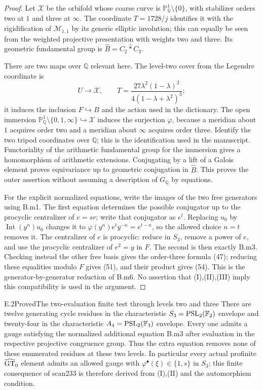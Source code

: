 \begin{proof}
Let $\mathcal X$ be the orbifold whose coarse curve is
$\mathbb P^1_\mathbb Q\setminus\{0\}$, with stabilizer orders two at
$1$ and three at $\infty$. The coordinate $T=1728/j$ identifies it with
the rigidification of $\mathcal M_{1,1}$ by its generic elliptic
involution; this can equally be seen from the weighted projective
presentation with weights two and three. Its geometric fundamental
group is $\widehat B=C_2\widehat * C_3$.

There are two maps over $\mathbb Q$ relevant here. The level-two cover
from the Legendre coordinate is
\[
 U\longrightarrow\mathcal X,\qquad
 T=\frac{27\lambda^2(1-\lambda)^2}
          {4(1-\lambda+\lambda^2)^3};
\]
it induces the inclusion $F\hookrightarrow B$ and the action used in
the dictionary. The open immersion
$\mathbb P^1_\mathbb Q\setminus\{0,1,\infty\}\hookrightarrow\mathcal X$
induces the surjection $\varphi$, because a meridian about $1$ acquires
order two and a meridian about $\infty$ acquires order three. Identify
the two tripod coordinates over $\mathbb Q$; this is the identification
used in the manuscript. Functoriality of the arithmetic fundamental
group for the immersion gives a homomorphism of arithmetic extensions.
Conjugating by a lift of a Galois element proves equivariance up to
geometric conjugation in $\widehat B$. This proves the outer assertion
without assuming a description of $G_\mathbb Q$ by equations.

For the explicit normalized equations, write the images of the two
free generators using B.m1. The first equation determines the possible
conjugator up to the procyclic centralizer of $e=sr$; write that conjugator as $e^t$. Replacing $u_0$ by
$\operatorname{Int}(y^n)u_0$ changes it to
$\varphi(y^n)e^t y^{-n}=e^{t-n}$, so the allowed choice $n=t$
removes it. The centralizer of $e$ is procyclic: reduce in $S_3$,
remove a power of $e$, and use the procyclic centralizer of
$e^2=y$ in $\widehat F$. The second is then exactly
B.m3. Checking instead the other free basis gives the order-three
formula (47); reducing these equalities modulo $F$ gives (51), and
their product gives (54). This is the generator-by-generator reduction
of B.m6. No assertion that (I),(II),(III) imply this compatibility is
used in the argument.
\end{proof}

\begin{claim}{E.2}{Proved}{The two-evaluation finite test through levels two and three}
There are twelve generating cycle residues in the characteristic
$S_3=\operatorname{PSL}_2(\mathbb F_2)$ envelope and twenty-four in the characteristic
$A_4=\operatorname{PSL}_2(\mathbb F_3)$ envelope. Every one admits a gauge satisfying
the normalized additional equation B.m3 after evaluation in the
respective projective congruence group. Thus the extra equation removes
none of these enumerated residues at these two levels. In particular every
actual profinite $\widehat{\mathrm{GT}}_0$ element admits an allowed gauge with
$\varphi^\bullet(\xi)\in\{1,s\}$ in $S_3$; this finite consequence of
scan233 is therefore derived from (I),(II) and the automorphism condition.
\end{claim}

